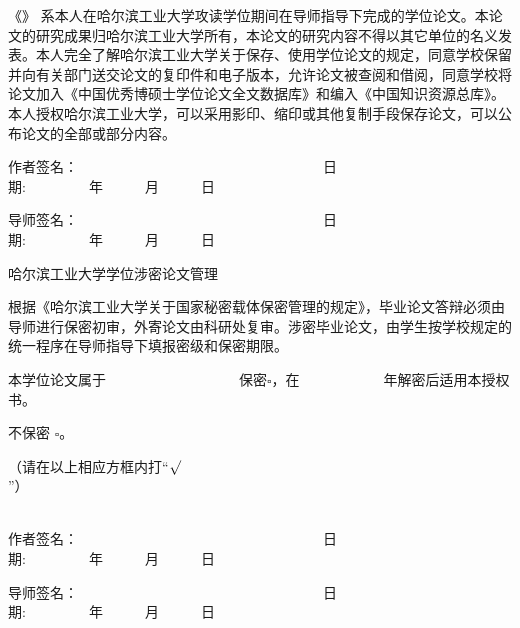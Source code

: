     《\chinesethesistitle》 系本人在哈尔滨工业大学攻读\cxuewei 学位期间在导师指导下完成的\cxuewei 学位论文。本论文的研究成果归哈尔滨工业大学所有，本论文的研究内容不得以其它单位的名义发表。本人完全了解哈尔滨工业大学关于保存、使用学位论文的规定，同意学校保留并向有关部门送交论文的复印件和电子版本，允许论文被查阅和借阅，同意学校将论文加入《中国优秀博硕士学位论文全文数据库》和编入《中国知识资源总库》。本人授权哈尔滨工业大学，可以采用影印、缩印或其他复制手段保存论文，可以公布论文的全部或部分内容。

\begin{flushright}

作者签名：~~~~~~~~~~~~~~~~~~~~~~~~~~~~~~~~~~~日期:~~~~~~~~~年~~~~~~月~~~~~~日~~~~

导师签名：~~~~~~~~~~~~~~~~~~~~~~~~~~~~~~~~~~~日期:~~~~~~~~~年~~~~~~月~~~~~~日~~~~

\end{flushright}

{} %

\begin{center}{\subchapterstyle 哈尔滨工业大学\cxuewei 学位涉密论文管理}\end{center}

    根据《哈尔滨工业大学关于国家秘密载体保密管理的规定》，毕业论文答辩必须由导师进行保密初审，外寄论文由科研处复审。涉密毕业论文，由学生按学校规定的统一程序在导师指导下填报密级和保密期限。

\begin{flushright}

本学位论文属于~~~~~~~~~~~~~~~~~~~保密$\square$，在~~~~~~~~~~~~年解密后适用本授权书。~~~~~

不保密
$\square$。~~~~~~~~~~~~~~~~~~~~~~~~~~~~~~~~~~~~~~~~~~~~~~~~~~~~~~~~~~~~~~

（请在以上相应方框内打“$\surd$”）~~~~~~~~~~~~~~~~~~~~~~~~~~~~~~~~~~~~~~~~~~~~~~~~~~~~~~~~~~~~~~~~~~~~~~~

\end{flushright}
\begin{flushright}

作者签名：~~~~~~~~~~~~~~~~~~~~~~~~~~~~~~~~~~~日期:~~~~~~~~~年~~~~~~月~~~~~~日~~~~

导师签名：~~~~~~~~~~~~~~~~~~~~~~~~~~~~~~~~~~~日期:~~~~~~~~~年~~~~~~月~~~~~~日~~~~

\end{flushright}
